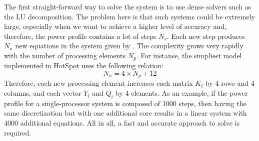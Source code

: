 The first straight-forward way to solve the system is to use dense solvers such as the LU decomposition. The problem here is that such systems could be extremely large, especially when we want to achieve a higher level of accuracy and, therefore, the power profile contains a lot of steps $N_s$. Each new step produces $N_n$ new equations in the system given by . The complexity grows very rapidly with the number of processing elements $N_p$. For instanse, the simpliest model implemented in HotSpot uses the following relation:
\[
  N_n = 4 \times N_p + 12
\]
Therefore, each new processing element increases each matrix $K_i$ by 4 rows and 4 columns, and each vector $Y_i$ and $Q_i$ by 4 elements. As an example, if the power profile for a single-processor system is composed of 1000 steps, then having the same discretization but with one additional core results in a linear system with 4000 additional equations. All in all, a fast and accurate approach to solve  is required.
